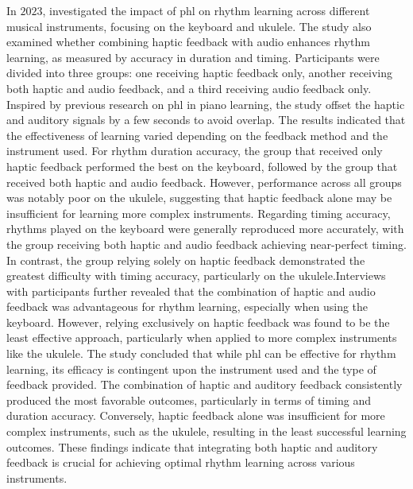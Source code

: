 In $2023$,  investigated the impact of \gls{phl} on rhythm learning across different musical instruments, focusing on the keyboard and ukulele. The study also examined whether combining haptic feedback with audio enhances rhythm learning, as measured by accuracy in duration and timing.
Participants were divided into three groups: one receiving haptic feedback only, another receiving both haptic and audio feedback, and a third receiving audio feedback only. Inspired by previous research on \gls{phl} in piano learning\cite{Donchev2021, Huang2010}, the study offset the haptic and auditory signals by a few seconds to avoid overlap. The results indicated that the effectiveness of learning varied depending on the feedback method and the instrument used. For rhythm duration accuracy, the group that received only haptic feedback performed the best on the keyboard, followed by the group that received both haptic and audio feedback. However, performance across all groups was notably poor on the ukulele, suggesting that haptic feedback alone may be insufficient for learning more complex instruments.
Regarding timing accuracy, rhythms played on the keyboard were generally reproduced more accurately, with the group receiving both haptic and audio feedback achieving near-perfect timing. In contrast, the group relying solely on haptic feedback demonstrated the greatest difficulty with timing accuracy, particularly on the ukulele.Interviews with participants further revealed that the combination of haptic and audio feedback was advantageous for rhythm learning, especially when using the keyboard. However, relying exclusively on haptic feedback was found to be the least effective approach, particularly when applied to more complex instruments like the ukulele. The study concluded that while \gls{phl} can be effective for rhythm learning, its efficacy is contingent upon the instrument used and the type of feedback provided. The combination of haptic and auditory feedback consistently produced the most favorable outcomes, particularly in terms of timing and duration accuracy. Conversely, haptic feedback alone was insufficient for more complex instruments, such as the ukulele, resulting in the least successful learning outcomes. These findings indicate that integrating both haptic and auditory feedback is crucial for achieving optimal rhythm learning across various instruments.

